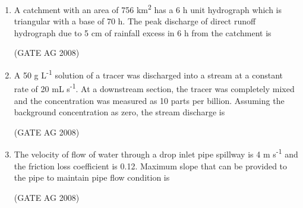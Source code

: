 \documentclass[journal]{IEEEtran}
\begin{document}
\begin{enumerate}
\medskip

\item 
 A catchment with an area of 756 km\textsuperscript{2} has a 6 h unit hydrograph which is triangular with a base of 70 h. The peak discharge of direct runoff hydrograph due to 5 cm of rainfall excess in 6 h from the catchment is
\begin{enumerate}
\end{enumerate}
\hfill(GATE AG 2008)\\

\medskip

\item 
 A 50 g L\textsuperscript{-1} solution of a tracer was discharged into a stream at a constant rate of 20 mL s\textsuperscript{-1}. At a downstream section, the tracer was completely mixed and the concentration was measured as 10 parts per billion. Assuming the background concentration as zero, the stream discharge is
\begin{enumerate}
\end{enumerate}
\hfill(GATE AG 2008)\\

\medskip

\item 
 The velocity of flow of water through a drop inlet pipe spillway is 4 m s\textsuperscript{-1} and the friction loss coefficient is 0.12. Maximum slope that can be provided to the pipe to maintain pipe flow condition is
\begin{enumerate}
\end{enumerate}
\hfill(GATE AG 2008)\\


\end{enumerate}
\end{document}
